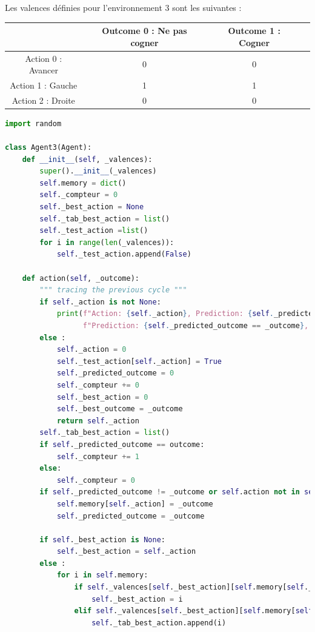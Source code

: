 \documentclass[a4paper, 12pt]{article}
\begin{document}
Les valences définies pour l'environnement 3 sont les suivantes :

\begin{center}
\begin{tabular}{|c|c|c|c|}
\hline
& Outcome 0 : Ne pas cogner & Outcome 1 : Cogner \\
\hline
Action 0 : Avancer & 0 & 0 \\
\hline
Action 1 : Gauche & 1 & 1 \\
\hline
Action 2 : Droite & 0 & 0 \\
\hline
\end{tabular}
\end{center}

\begin{lstlisting}[language=Python]
import random

class Agent3(Agent):
    def __init__(self, _valences):
        super().__init__(_valences)
        self.memory = dict()
        self._compteur = 0
        self._best_action = None
        self._tab_best_action = list()
        self._test_action =list()
        for i in range(len(_valences)):
            self._test_action.append(False)
        
    def action(self, _outcome):
        """ tracing the previous cycle """
        if self._action is not None:
            print(f"Action: {self._action}, Prediction: {self._predicted_outcome}, Outcome: {_outcome}, "
                  f"Prediction: {self._predicted_outcome == _outcome}, Valence: {self._valences[self._action][_outcome]}")
        else :
            self._action = 0
            self._test_action[self._action] = True
            self._predicted_outcome = 0
            self._compteur += 0
            self._best_action = 0
            self._best_outcome = _outcome
            return self._action
        self._tab_best_action = list()
        if self._predicted_outcome == outcome:
            self._compteur += 1
        else:
            self._compteur = 0
        if self._predicted_outcome != _outcome or self.action not in self.memory:
            self.memory[self._action] = _outcome
            self._predicted_outcome = _outcome
            
        if self._best_action is None:
            self._best_action = self._action
        else :
            for i in self.memory:
                if self._valences[self._best_action][self.memory[self._best_action]] < self._valences[i][self.memory[i]]:
                    self._best_action = i
                elif self._valences[self._best_action][self.memory[self._best_action]] == self._valences[i][self.memory[i]]:
                    self._tab_best_action.append(i)
            

\end{lstlisting}
\end{document}
